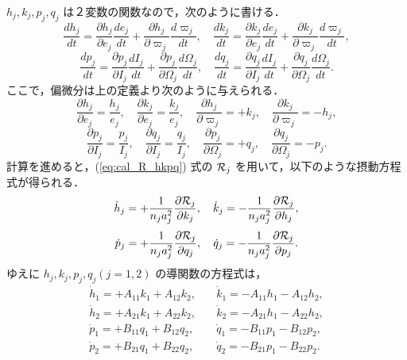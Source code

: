 \documentclass[11pt,a4paper,oneside,onecolumn]{jarticle}
\begin{document}
$h_j, k_j, p_j, q_j$ は２変数の関数なので，次のように書ける．
\begin{equation}
\frac{d h_j}{dt} = \frac{\partial h_j}{\partial e_j} \frac{d e_j}{dt} + \frac{\partial h_j}{\partial \varpi_j} \frac{d \varpi_j}{dt} , \quad \frac{d k_j}{dt} = \frac{\partial k_j}{\partial e_j} \frac{d e_j}{dt} + \frac{\partial k_j}{\partial \varpi_j} \frac{d \varpi_j}{dt},
\end{equation}
\begin{equation}
\frac{d p_j}{dt} = \frac{\partial p_j}{\partial I_j} \frac{d I_j}{dt} + \frac{\partial p_j}{\partial \Omega_j} \frac{d \Omega_j}{dt} , \quad \frac{d q_j}{dt} = \frac{\partial q_j}{\partial I_j} \frac{d I_j}{dt} + \frac{\partial q_j}{\partial \Omega_j} \frac{d \Omega_j}{dt}.
\end{equation}
ここで，偏微分は上の定義より次のように与えられる．
\begin{equation}
\frac{\partial h_j}{\partial e_j} = \frac{h_j}{e_j}, \quad \frac{\partial k_j}{\partial e_j} = \frac{k_j}{e_j}, \quad \frac{\partial h_j}{\partial \varpi_j} = + k_j, \quad \frac{\partial k_j}{\partial \varpi_j} = - h_j,
\end{equation}
\begin{equation}
\frac{\partial p_j}{\partial I_j} = \frac{p_j}{I_j}, \quad \frac{\partial q_j}{\partial I_j} = \frac{q_j}{I_j}, \quad \frac{\partial p_j}{\partial \Omega_j} = + q_j, \quad \frac{\partial q_j}{\partial \Omega_j} = - p_j.
\end{equation}
計算を進めると，(\ref{eq:cal_R_hkpq}) 式の ${\cal R}_j$ を用いて，以下のような摂動方程式が得られる．
\begin{equation}
\dot{h}_j = + \frac{1}{n_j a_j^2} \frac{\partial {\cal R}_j}{\partial k_j}, \quad \dot{k}_j = - \frac{1}{n_j a_j^2} \frac{\partial {\cal R}_j}{\partial h_j},
\end{equation}
\begin{equation}
\dot{p}_j = + \frac{1}{n_j a_j^2} \frac{\partial {\cal R}_j}{\partial q_j}, \quad \dot{q}_j = - \frac{1}{n_j a_j^2} \frac{\partial {\cal R}_j}{\partial p_j}.
\end{equation}
ゆえに $h_j, k_j, p_j, q_j (j = 1, 2)$ の導関数の方程式は，
\begin{equation}
\begin{split}
\dot{h}_1= + A_{11} k_1 + A_{12} k_2, & \quad \dot{k}_1 = - A_{11} h_1 - A_{12} h_2, \\
\dot{h}_2 = + A_{21} k_1 + A_{22} k_2, & \quad \dot{k}_2 = - A_{21} h_1 - A_{22} h_2, \\
\dot{p}_1 = + B_{11} q_1 + B_{12} q_2, & \quad \dot{q}_1 = - B_{11} p_1 - B_{12} p_2, \\
\dot{p}_2 = + B_{21} q_1 + B_{22} q_2, & \quad \dot{q}_2 = - B_{21} p_1 - B_{22} p_2.
\end{split}
\end{equation}
\end{document}
